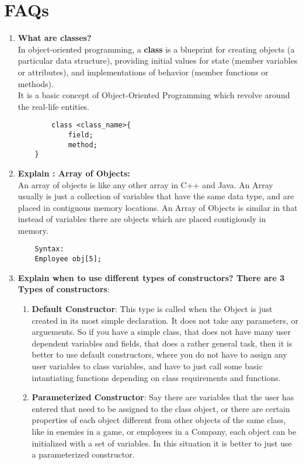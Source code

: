\documentclass[11pt]{article}
\begin{document}
\pagebreak

\section{FAQs}

\begin{enumerate}
	\item \textbf{What are classes?}\\

	In object-oriented programming, a \textbf{class} is a blueprint for creating objects (a particular data structure), providing initial values for state (member variables or attributes), and implementations of behavior (member functions or methods).
	\\ It is a basic concept of Object-Oriented Programming which revolve around the real-life entities. 
	
	\begin{verbatim}
		class <class_name>{  
			field;  
			method;  
  	}
	\end{verbatim}

	\item \textbf{ Explain : Array of Objects:} \\
 
	An array of objects is like any other array in C++ and Java. An Array usually is just a collection of variables that have the same data type, and are placed in contiguous memory locations. An Array of Objects is similar in that instead of variables there are objects which are placed contigiously in memory. 

	\begin{verbatim}
	Syntax: 
	Employee obj[5];
	\end{verbatim}
	\item \textbf{Explain when to use different types of constructors?
	There are 3 Types of constructors}: 
	\begin{enumerate}
		\item \textbf{Default Constructor}: This type is called when the Object is just created in its most simple declaration. 
		It does not take any parameters, or arguements. So if you have a simple class, that does not have many user dependent variables and fields, that does a rather general task, then it is better to use default constructors, where you do not have to assign any user variables to class variables, and have to just call some basic intantiating functions depending on class requirements and functions. 
		
		\item \textbf{Parameterized Constructor}: Say there are variables that the user has entered that need to be assigned to the class object, or there are certain properties of each object different from other objects of the same class, like in enemies in a game, or employees in a Company, each object can be initialized with a set of variables. In this situation it is better to just use a parameterized constructor. 
		

\end{enumerate}
\end{enumerate}
\end{document}
